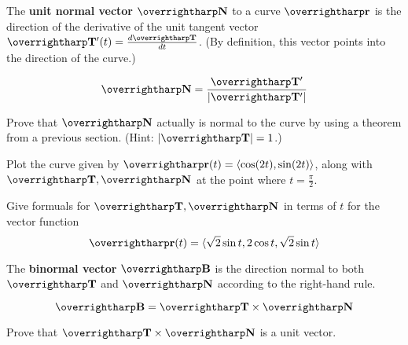 \documentclass[letterpaper, twoside, 12pt]{book}
\begin{document}
\begin{definition}
  The \textbf{unit normal vector} $\vect{N}$ to a curve $\vect{r}$ is the
  direction of the derivative of the unit tangent vector
  $\vect{T}'(t)=\frac{d\vect{T}}{dt}$.
  (By definition, this vector points into the direction of the curve.)
\end{definition}

\begin{theorem}
  \[
    \vect{N} = \frac{\vect{T}'}{|\vect{T}'|}
  \]
\end{theorem}

          \begin{problem}
            Prove that $\vect{N}$ actually is normal to the curve by
            using a theorem from a previous section. (Hint: $|\vect{T}|=1$.)
          \end{problem}

          \begin{solution}

          \end{solution}

          \begin{problem}
            Plot the curve given by $\vect{r}(t)=\<\cos(2t),\sin(2t)\>$,
            along with $\vect{T},\vect{N}$ at the point where
            $t=\frac{\pi}{2}$.
          \end{problem}

          \begin{problem}
            Give formuals for $\vect{T},\vect{N}$ in terms of $t$ for
            the vector function
            \[\vect{r}(t) = \< \sqrt{2}\sin t,2\cos t,\sqrt{2}\sin t \>\]
          \end{problem}

          \begin{solution}

          \end{solution}

\begin{definition}
  The \textbf{binormal vector} $\harpvec{B}$ is the direction
  normal to both $\harpvec{T}$ and $\harpvec{N}$ according to
  the right-hand rule.
\end{definition}

\begin{theorem}
  \[
    \vect{B}=\vect{T}\times\vect{N}
  \]
\end{theorem}

          \begin{problem}
            Prove that $\vect{T}\times\vect{N}$ is a unit vector.
          \end{problem}
\end{document}
